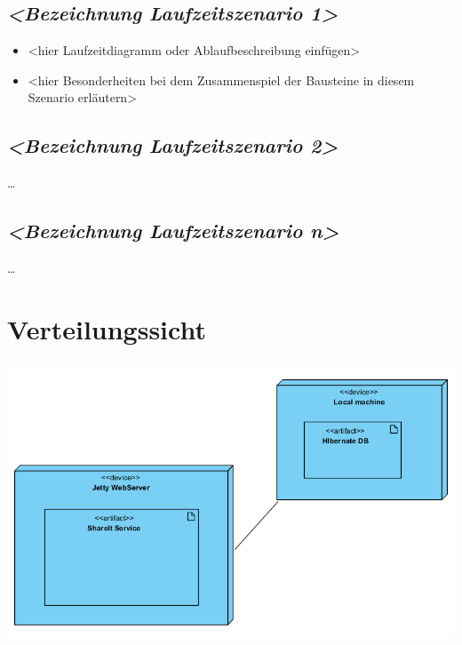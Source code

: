 \documentclass[]{article}
\begin{document}
\subsection{\texorpdfstring{\emph{\textless{}Bezeichnung
Laufzeitszenario
1\textgreater{}}}{\textless{}Bezeichnung Laufzeitszenario 1\textgreater{}}}\label{__emphasis_bezeichnung_laufzeitszenario_1_emphasis}

\begin{itemize}
\item
  \textless{}hier Laufzeitdiagramm oder Ablaufbeschreibung
  einfügen\textgreater{}
\item
  \textless{}hier Besonderheiten bei dem Zusammenspiel der Bausteine in
  diesem Szenario erläutern\textgreater{}
\end{itemize}

\subsection{\texorpdfstring{\emph{\textless{}Bezeichnung
Laufzeitszenario
2\textgreater{}}}{\textless{}Bezeichnung Laufzeitszenario 2\textgreater{}}}\label{__emphasis_bezeichnung_laufzeitszenario_2_emphasis}

\ldots{}

\subsection{\texorpdfstring{\emph{\textless{}Bezeichnung
Laufzeitszenario
n\textgreater{}}}{\textless{}Bezeichnung Laufzeitszenario n\textgreater{}}}\label{__emphasis_bezeichnung_laufzeitszenario_n_emphasis}

\ldots{}

\section{Verteilungssicht}\label{section-deployment-view}

\includegraphics{images/UMLDeploymentDiag.PNG}
\end{document}
